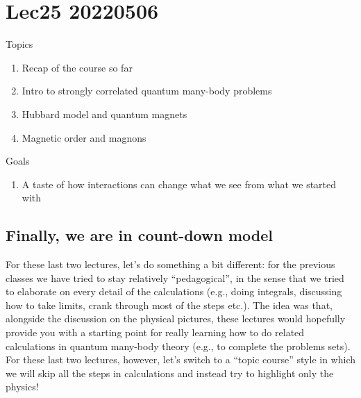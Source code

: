 \chapter{Lec25 20220506}

Topics

\begin{enumerate}
    \item Recap of the course so far
    \item Intro to strongly correlated quantum many-body problems
    \item Hubbard model and quantum magnets
    \item Magnetic order and magnons
\end{enumerate}

Goals

\begin{enumerate}
    \item A taste of how interactions can change what we see from what we started with
\end{enumerate}

\section{Finally, we are in count-down model}

For these last two lectures, let's do something a bit different: for the previous classes we have tried to stay relatively ``pedagogical'', in the sense that we tried to elaborate on every detail of the calculations (e.g., doing integrals, discussing how to take limits, crank through most of the steps etc.). The idea was that, alongside the discussion on the physical pictures, these lectures would hopefully provide you with a starting point for really learning how to do related calculations in quantum many-body theory (e.g., to complete the problems sets). For these last two lectures, however, let's switch to a ``topic course'' style in which we will skip all the steps in calculations and instead try to highlight only the physics!

